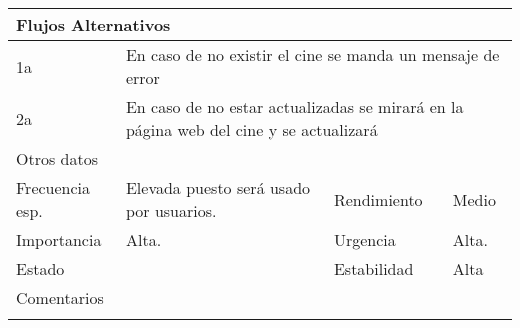 \documentclass{article}
\begin{document}
\begin{table}[h]
\begin{tabular}{|l|l|l|l|l|l|}
\hline
\multicolumn{6}{|p{10cm}|}{Flujos Alternativos}\\
\hline
\multicolumn{1}{|p{0.5cm}}{1a} & \multicolumn{5}{|p{9cm}|}{En caso de no existir el cine se manda un mensaje de error}\\
\hline
\multicolumn{1}{|p{0.5cm}}{2a} & \multicolumn{5}{|p{9cm}|}{En caso de no estar actualizadas se mirará en la página web del cine y se actualizará}\\
\hline
\multicolumn{6}{|p{10cm}|}{Otros datos}\\
\hline
\multicolumn{1}{|p{2cm}|}{Frecuencia esp.} & \multicolumn{2}{p{3cm}}{Elevada puesto será usado por usuarios.} & \multicolumn{1}{|p{2cm}|}{Rendimiento} & \multicolumn{2}{p{3cm}|}{Medio}\\
\hline
\multicolumn{1}{|p{2cm}|}{Importancia} & \multicolumn{2}{p{3cm}}{Alta.} & \multicolumn{1}{|p{2cm}|}{Urgencia} & \multicolumn{2}{p{3cm}|}{Alta.}\\
\hline
\multicolumn{1}{|p{2cm}|}{Estado} & \multicolumn{2}{p{3cm}}{} & \multicolumn{1}{|p{2cm}|}{Estabilidad} & \multicolumn{2}{p{3cm}|}{Alta}\\
\hline
\multicolumn{6}{|p{10cm}|}{Comentarios}\\
\hline
\multicolumn{6}{|p{10cm}|}{}\\
\hline
\end{tabular}
\end{table}
\addtocounter{ni}{1}
\end{document}
